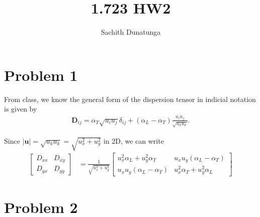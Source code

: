 \documentclass{article}
\title{1.723 HW2}
\author{Sachith  Dunatunga}
\begin{document}
\maketitle

%
%
%
\section{Problem 1}
From class, we know the general form of the dispersion tensor in indicial notation is given by
\begin{align}
    \mathbf{D}_{ij} = \alpha_T \sqrt{u_i u_j} \delta_{ij} + (\alpha_L - \alpha_T) \frac{u_i u_j}{\sqrt{u_k u_k}}.
\end{align}

Since $|\mathbf{u}| = \sqrt{u_k u_k} = \sqrt{u_x^2 + u_y^2}$ in 2D, we can write
\begin{align}
    \begin{bmatrix}
        D_{xx} & D_{xy} \\
        D_{yx} & D_{yy}
    \end{bmatrix} &= \frac{1}{\sqrt{u_x^2 + u_y^2}}
    \begin{bmatrix}
        u_x^2 \alpha_L  + u_y^2 \alpha_T & u_x u_y (\alpha_L - \alpha_T) \\
        u_x u_y (\alpha_L - \alpha_T) & u_x^2 \alpha_T + u_y^2 \alpha_L
    \end{bmatrix}
\end{align}
\section{Problem 2}
\end{document}
